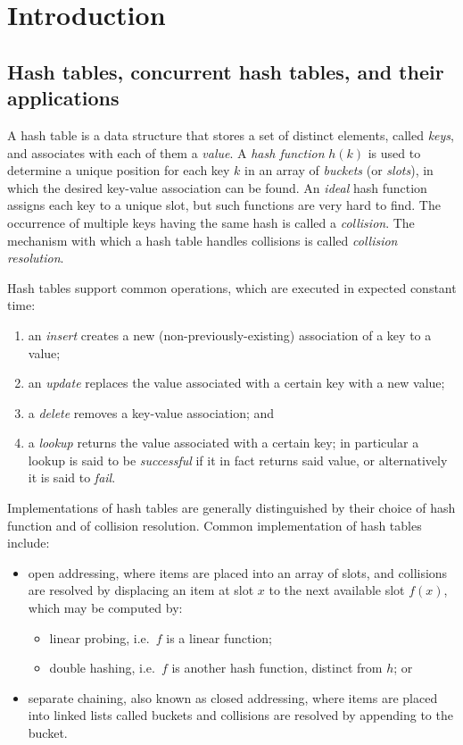\chapter{Introduction}\label{ch:introduction}


\section{Hash tables, concurrent hash tables, and their applications}\label{sec:hash-tables}

A hash table is a data structure that stores a set of distinct elements, called \emph{keys}, and associates with each of them a \emph{value}.
A \emph{{hash function}} $h(k)$ is used to determine a unique position for each key $k$ in an array of \emph{buckets} (or \emph{slots}), in which the desired key-value association can be found.
An \emph{ideal} hash function assigns each key to a unique slot, but such functions are very hard to find.
The occurrence of multiple keys having the same hash is called a \emph{collision}.
The mechanism with which a hash table handles collisions is called \emph{{collision resolution}}.

Hash tables support common operations, which are executed in expected constant time:
\begin{enumerate}
    \item an \emph{insert} creates a new (non-previously-existing) association of a key to a value;
    \item an \emph{update} replaces the value associated with a certain key with a new value;
    \item a \emph{delete} removes a key-value association; and
    \item a \emph{lookup} returns the value associated with a certain key; in particular a lookup is said to be \emph{successful} if it in fact returns said value, or alternatively it is said to \emph{fail}.
\end{enumerate}

Implementations of hash tables are generally distinguished by their choice of hash function and of collision resolution.
Common implementation of hash tables include:
\begin{itemize}
    \item open addressing, where items are placed into an array of slots, and collisions are resolved by displacing an item at slot $x$ to the next available slot $f(x)$, which may be computed by:
    \begin{itemize}
        \item linear probing, i.e.\ $f$ is a linear function;
        \item double hashing, i.e.\ $f$ is another hash function, distinct from $h$; or
    \end{itemize}
    \item separate chaining, also known as closed addressing, where items are placed into linked lists called buckets and collisions are resolved by appending to the bucket.
\end{itemize}

